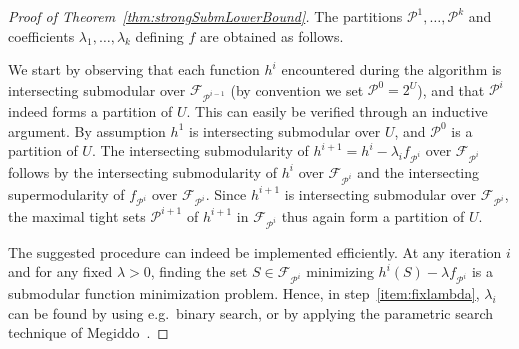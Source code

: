 \documentclass[11pt, letterpaper]{article}
\theoremstyle{definition}
\begin{document}
\begin{proof}[Proof of Theorem~\ref{thm:strongSubmLowerBound}]
The partitions $\mathcal{P}^1,\dots, \mathcal{P}^k$ and coefficients
$\lambda_1,\dots, \lambda_k$ defining $f$ are obtained as follows.


\begin{center}
\end{center}

We start by observing that each function $h^i$ encountered
during the algorithm is intersecting submodular over
$\mathcal{F}_{\mathcal{P}^{i-1}}$ (by convention we set 
$\mathcal{P}^0=2^U$), and that
$\mathcal{P}^i$ indeed forms a partition of $U$.
This can easily be verified through an inductive argument.
By assumption $h^1$ is intersecting submodular over $U$,
and $\mathcal{P}^0$ is a partition of $U$.
The intersecting submodularity of
$h^{i+1}=h^i-\lambda_i f_{\mathcal{P}^i}$ over
$\mathcal{F}_{\mathcal{P}^i}$ follows by the intersecting
submodularity of $h^i$ over $\mathcal{F}_{\mathcal{P}^i}$
and the intersecting supermodularity of
$f_{\mathcal{P}^i}$ over $\mathcal{F}_{\mathcal{P}^i}$.
Since $h^{i+1}$ is intersecting submodular
over $\mathcal{F}_{\mathcal{P}^i}$, the maximal tight
sets $\mathcal{P}^{i+1}$ of $h^{i+1}$ in
$\mathcal{F}_{\mathcal{P}^i}$ thus again form a partition of $U$.

The suggested procedure can indeed be
implemented efficiently.
At any iteration $i$ and for any fixed $\lambda>0$,
finding the set $S\in\mathcal{F}_{\mathcal{P}^i}$ minimizing
$h^i(S)-\lambda f_{\mathcal{P}^i}$ is a submodular function
minimization problem. Hence, in step~\eqref{item:fixlambda},
$\lambda_i$ can be found
by using e.g.~binary search, or by applying the parametric
search technique of Megiddo~\cite{megiddo_1983_applying}.


\end{proof}
\end{document}
